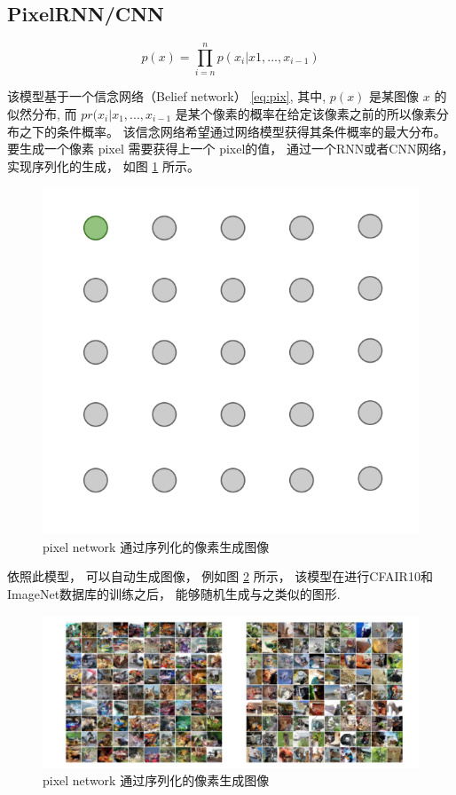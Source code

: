 \subsection{PixelRNN/CNN}

\begin{equation}\label{eq:pix}
p(x) = \prod_{i=n}^{n} p(x_i|x1, ..., x_{i-1})
\end{equation}

该模型基于一个信念网络（Belief network） \eqref{eq:pix}, 其中, $ p(x) $ 是某图像 $x$ 的似然分布, 而 $pr(x_i|x_1, ..., x_{i-1}$ 是某个像素的概率在给定该像素之前的所以像素分布之下的条件概率。 该信念网络希望通过网络模型获得其条件概率的最大分布。 要生成一个像素 pixel 需要获得上一个 pixel的值， 通过一个RNN或者CNN网络， 实现序列化的生成， 如图 \ref{img:pix-matrix} 所示。 

\begin{figure}[htbp]
    \centering  %
    \includegraphics[width = .55\linewidth]{data/chapter-2/pixel_matrix.png} %
    \caption{pixel network 通过序列化的像素生成图像} %
    \label{img:pix-matrix} %
\end{figure}

依照此模型， 可以自动生成图像， 例如图 \ref{img:pix-example} 所示， 该模型在进行CFAIR10和ImageNet数据库的训练之后， 能够随机生成与之类似的图形. 

\begin{figure}[htbp]
    \centering  %
    \includegraphics[width = .55\linewidth]{data/chapter-2/pixel_example.png} %
    \caption{pixel network 通过序列化的像素生成图像} %
    \label{img:pix-example} %
\end{figure}



